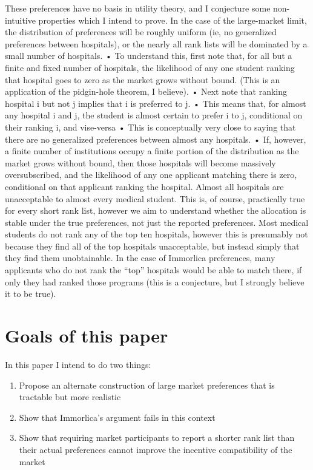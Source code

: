 \documentclass[WP]{AEA}
\begin{document}
These preferences have no basis in utility theory, and I conjecture some non-intuitive properties which I intend to prove.	
In the case of the large-market limit, the distribution of preferences will be roughly uniform (ie, no generalized preferences between hospitals), or the nearly all rank lists will be dominated by a small number of hospitals.
•	To understand this, first note that, for all but a finite and fixed number of hospitals, the likelihood of any one student ranking that hospital goes to zero as the market grows without bound. (This is an application of the pidgin-hole theorem, I believe).
•	Next note that ranking hospital i but not j implies that i is preferred to j.  
•	This means that, for almost any hospital i and j, the student is almost certain to prefer i to j, conditional on their ranking i, and vise-versa
•	This is conceptually very close to saying that there are no generalized preferences between almost any hospitals.
•	If, however, a finite number of institutions occupy a finite portion of the distribution as the market grows without bound, then those hospitals will become massively oversubscribed, and the likelihood of any one applicant matching there is zero, conditional on that applicant ranking the hospital.
Almost all hospitals are unacceptable to almost every medical student.  This is, of course, practically true for every short rank list, however we aim to understand whether the allocation is stable under the true preferences, not just the reported preferences.  Most medical students do not rank any of the top ten hospitals, however this is presumably not because they find all of the top hospitals unacceptable, but instead simply that they find them unobtainable.  In the case of Immorlica preferences, many applicants who do not rank the “top” hospitals would be able to match there, if only they had ranked those programs (this is a conjecture, but I strongly believe it to be true).

\section{Goals of this paper}
In this paper I intend to do two things:
\begin{enumerate}
	\item Propose an alternate construction of large market preferences that is tractable but more realistic 
	\item Show that Immorlica's argument fails in this context
	\item Show that requiring market participants to report a shorter rank list than their actual preferences cannot improve the incentive compatibility of the market

\end{enumerate}
\end{document}
